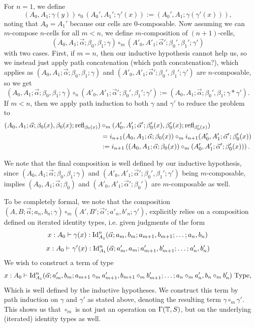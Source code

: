\documentclass{article}
\begin{document}
\begin{defn}
    For $n=1$, we define
    $$ (A_0,A_1;\gamma(y))\circ_0(A_0',A_1';\gamma'(x)):=(A_0',A_1;\gamma(\gamma'(x))), $$
    noting that $A_0=A_1'$ because our cells are 0-composable. Now assuming we can $m$-compose $n$-cells for all $m<n$, we define $m$-composition of $(n+1)$-cells,
    $$ (A_0,A_1;\vec{\alpha};\beta_0,\beta_1;\gamma)\circ_m(A'_0,A'_1;\vec{\alpha}';\beta_0',\beta_1';\gamma') $$
    with two cases. First, if $m=n$, then our inductive hypothesis cannot help us, so we instead just apply path concatenation (which path concatenation?), which applies as $(A_0,A_1;\vec{\alpha};\beta_0,\beta_1;\gamma)$ and $(A'_0,A'_1;\vec{\alpha}';\beta_0',\beta_1';\gamma')$ are $n$-composable, so we get
    $$ (A_0,A_1;\vec{\alpha};\beta_0,\beta_1;\gamma)\circ_n(A'_0,A'_1;\vec{\alpha}';\beta_0',\beta_1';\gamma'):=(A_0,A_1;\vec{\alpha};\beta_0',\beta_1;\gamma*\gamma'). $$
    If $m<n$, then we apply path induction to both $\gamma$ and $\gamma'$ to reduce the problem to
    \begin{align*}
        (A_0,A_1;\vec{\alpha};\beta_0(x),\beta_0(x);\operatorname{refl}_{\beta_0(x)})&\circ_m(A'_0,A'_1;\vec{\alpha}';\beta_0'(x),\beta_0'(x);\operatorname{refl}_{\beta_0'(x)})\\
        &=i_{n+1}(A_0,A_1;\vec{\alpha};\beta_0(x))\circ_mi_{n+1}(A'_0,A'_1;\vec{\alpha}';\beta_0'(x))\\
        &:=i_{n+1}\left((A_0,A_1;\vec{\alpha};\beta_0(x))\circ_m(A'_0,A'_1;\vec{\alpha}';\beta_0'(x))\right).
    \end{align*}
\end{defn}

We note that the final composition is well defined by our inductive hypothesis, since $(A_0,A_1;\vec{\alpha};\beta_0,\beta_1;\gamma)$ and $(A'_0,A'_1;\vec{\alpha}';\beta_0',\beta_1';\gamma')$ being $m$-composable, implies $(A_0,A_1;\vec{\alpha};\beta_0)$ and $(A'_0,A'_1;\vec{\alpha}';\beta_0')$ are $m$-composable as well.

To be completely formal, we note that the composition $(A,B;\vec{\alpha};a_n,b_n;\gamma)\circ_m(A',B';\vec{\alpha}';a'_n,b'_n;\gamma')$, explicitly relies on a composition defined on iterated identity types, i.e. given judgments of the form
$$ x:A_0\vdash\gamma(x):\operatorname{Id}_{A_1}^n(\vec{\alpha};a_m,b_m;a_{m+1},b_{m+1};\dots;a_n,b_n) $$
$$ x:A_0\vdash\gamma'(x):\operatorname{Id}_{A_1}^n(\vec{\alpha};a'_m,a_m;a'_{m+1},b'_{m+1};\dots;a'_n,b'_n) $$
We wish to construct a term of type
$$ x:A_0\vdash\operatorname{Id}_{A_1}^n(\vec{\alpha};a'_m,b_m;a_{m+1}\circ_ma'_{m+1},b_{m+1}\circ_mb'_{m+1};\dots;a_n\circ_ma'_n,b_n\circ_mb'_n)\text{ Type}, $$
Which is well defined by the inductive hypotheses. We construct this term by path induction on $\gamma$ and $\gamma'$ as stated above, denoting the resulting term $\gamma\circ_m\gamma'$. This shows us that $\circ_m$ is not just an operation on $\Gamma(\mathbb{T},S)$, but on the underlying (iterated) identity types as well.
\end{document}
